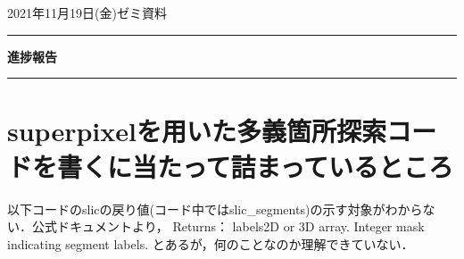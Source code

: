 \documentclass[11pt,a4j]{jarticle} 			%
\begin{document}
	

	\noindent

	
	\hspace{1em}

	2021年11月19日(金)ゼミ資料

	\hfill
	
	\vspace{2mm}

	
	\hrule

	
	\begin{center}

		{\Large \bf 進捗報告}

	\end{center}

	\hrule

	\vspace{3mm}

	
	\section{superpixelを用いた多義箇所探索コードを書くに当たって詰まっているところ}
	以下コードのslicの戻り値(コード中ではslic\_segments)の示す対象がわからない．公式ドキュメントより，
	Returns：
	labels2D or 3D array.
	Integer mask indicating segment labels.
	とあるが，何のことなのか理解できていない．
	
\end{document}
